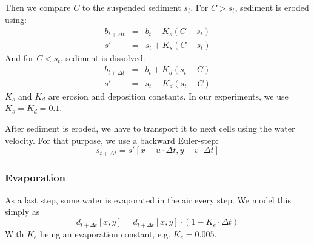 \documentclass[journal, letterpaper]{IEEEtran}
\begin{document}
Then we compare $C$ to the suspended sediment $s_t$.
For $C>s_t$, sediment is eroded using:
\begin{equation}
\begin{array}{rcl}
	b_{t+\Delta t} &=& b_t - K_s (C-s_t) \\
	s' &=& s_t + K_s (C-s_t)
\end{array}
\label{eq:ErosionSediment3_1}
\end{equation}
And for $C<s_t$, sediment is dissolved:
\begin{equation}
\begin{array}{rcl}
	b_{t+\Delta t} &=& b_t + K_d (s_t-C) \\
	s' &=& s_t - K_d (s_t-C)
\end{array}
\label{eq:ErosionSediment3_2}
\end{equation}
$K_s$ and $K_d$ are erosion and deposition constants. In our experiments, we use $K_s=K_d=0.1$.

After sediment is eroded, we have to transport it to next cells using the water velocity. For that purpose, we use a backward Euler-step:
\begin{equation}
	s_{t+\Delta t} = s'[x-u \cdot \Delta t, y - v \cdot \Delta t]
\label{eq:ErosionSediment4}
\end{equation}

\subsubsection{Evaporation}
As a last step, some water is evaporated in the air every step. We model this simply as
\begin{equation}
	d_{t+\Delta t}[x,y] = d_{t+\Delta t}[x,y] \cdot (1-K_e \cdot \Delta t)
\label{eq:ErosionEvaporation}
\end{equation}
With $K_e$ being an evaporation constant, e.g. $K_e=0.005$.
\end{document}
